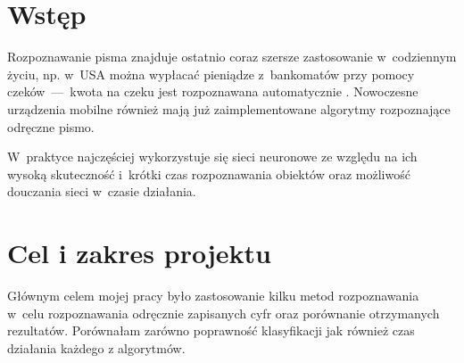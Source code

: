 \documentclass[12pt]{article}
\begin{document}
 





\newpage
\tableofcontents
\newpage
\section{Wstęp}
Rozpoznawanie pisma znajduje ostatnio coraz szersze zastosowanie w~codziennym życiu, np. w~USA można wypłacać pieniądze z~bankomatów przy pomocy czeków~---~kwota na czeku jest rozpoznawana automatycznie \cite{glowna praca}. Nowoczesne urządzenia mobilne również mają już zaimplementowane algorytmy rozpoznające odręczne pismo.

W~praktyce najczęściej wykorzystuje się sieci neuronowe ze względu na ich wysoką skuteczność i~krótki czas rozpoznawania obiektów oraz możliwość douczania sieci w~czasie działania.


\section{Cel i zakres projektu}
Głównym celem mojej pracy było zastosowanie kilku metod rozpoznawania w~celu rozpoznawania odręcznie zapisanych cyfr oraz porównanie otrzymanych rezultatów. Porównałam zarówno poprawność klasyfikacji jak również czas działania każdego z algorytmów.
\end{document}
